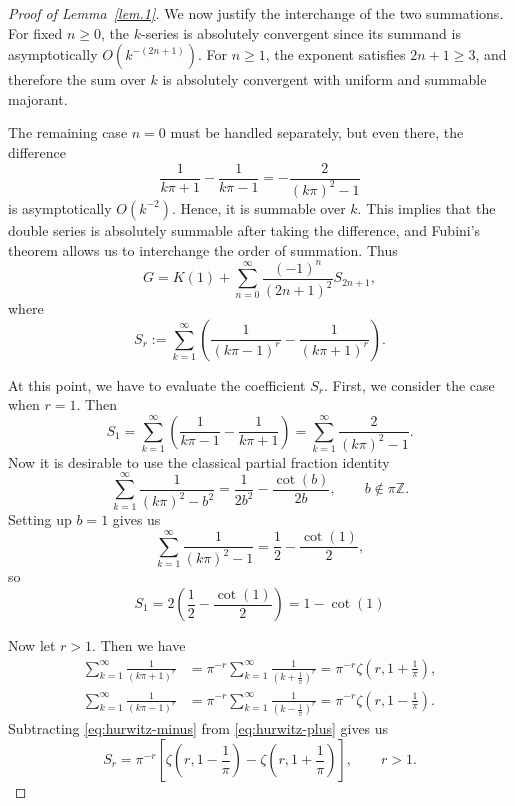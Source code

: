 \documentclass[preprint,12pt,nopreprintline]{elsarticle}
\begin{document}
\begin{proof}[Proof of Lemma~\ref{lem.1}]
We now justify the interchange of the two summations. For fixed $n\ge 0$, the $k$-series is absolutely convergent since its summand is asymptotically $O(k^{-(2n+1)})$. For $n\ge 1$, the exponent satisfies $2n+1\ge 3$, and therefore the sum over $k$ is absolutely convergent with uniform and summable majorant. 

The remaining case $n=0$ must be handled separately, but even there, the difference
\[
\frac{1}{k\pi+1}-\frac{1}{k\pi-1}
=
-\frac{2}{(k\pi)^2-1}
\]
is asymptotically $O(k^{-2})$. Hence, it is summable over $k$. This implies that the double series is absolutely summable after taking the difference, and Fubini's theorem allows us to interchange the order of summation. Thus
\begin{equation}\label{eq:G-series-reordered}
G
=
K(1)
+
\sum_{n=0}^{\infty}\frac{(-1)^n}{(2n+1)^2}S_{2n+1},
\end{equation}
where
\begin{equation}\label{eq:Sr-def}
S_r
:=
\sum_{k=1}^{\infty}
\left(
\frac{1}{(k\pi-1)^r}
-
\frac{1}{(k\pi+1)^r}
\right).
\end{equation}

At this point, we have to evaluate the coefficient $S_r$. First, we consider the case when $r=1$. Then
\begin{equation}\label{eq:S1-expand}
S_1
=
\sum_{k=1}^{\infty}
\left(
\frac{1}{k\pi-1}
-
\frac{1}{k\pi+1}
\right)
=
\sum_{k=1}^{\infty}
\frac{2}{(k\pi)^2-1}.
\end{equation}
Now it is desirable to use the classical partial fraction identity
\begin{equation}\label{eq:cot-partial-fraction}
\sum_{k=1}^{\infty}\frac{1}{(k\pi)^2-b^2}
=
\frac{1}{2b^2}
-
\frac{\cot \left(b\right)}{2b},
\qquad b\notin \pi\mathbb{Z}.
\end{equation}
Setting up $b=1$ gives us
\[
\sum_{k=1}^{\infty}\frac{1}{(k\pi)^2-1}
=
\frac12-\frac{\cot \left(1\right)}{2},
\]
so
\begin{equation}\label{eq:S1-value}
S_1
=
2\left(\frac12-\frac{\cot \left(1\right)}{2}\right)
=1-\cot \left(1\right)
\end{equation}

Now let $r>1$. Then we have
\begin{align}
\sum_{k=1}^{\infty}\frac{1}{(k\pi+1)^r}
&=
\pi^{-r}\sum_{k=1}^{\infty}\frac{1}{\left(k+\frac{1}{\pi}\right)^r}
=
\pi^{-r}\zeta\!\left(r,1+\frac{1}{\pi}\right),
\label{eq:hurwitz-plus}
\\
\sum_{k=1}^{\infty}\frac{1}{(k\pi-1)^r}
&=
\pi^{-r}\sum_{k=1}^{\infty}\frac{1}{\left(k-\frac{1}{\pi}\right)^r}
=
\pi^{-r}\zeta\!\left(r,1-\frac{1}{\pi}\right).
\label{eq:hurwitz-minus}
\end{align}
Subtracting \eqref{eq:hurwitz-minus} from \eqref{eq:hurwitz-plus} gives us
\begin{equation}\label{eq:Sr-hurwitz}
S_r
=
\pi^{-r}
\left[
\zeta\!\left(r,1-\frac{1}{\pi}\right)
-
\zeta\!\left(r,1+\frac{1}{\pi}\right)
\right],
\qquad r>1.
\end{equation}


\end{proof}
\end{document}
